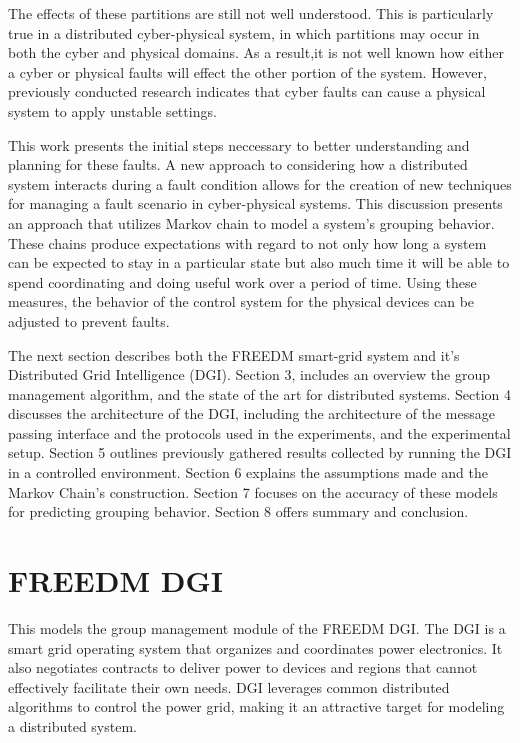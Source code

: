 The effects of these partitions are still not well understood.
This is particularly true in a distributed cyber-physical system, in which partitions may occur in both the cyber and physical domains.
As a result,it is not well known how either a cyber or physical faults will effect the other portion of the system.
However, previously conducted research \cite{HARINI}\cite{TSG} indicates that cyber faults can cause a
physical system to apply unstable settings.

This work presents the initial steps neccessary to better understanding and planning for these faults.
A new approach to considering how a distributed system interacts during a fault condition allows for the creation of new techniques for managing a fault scenario in cyber-physical systems. 
This discussion presents an approach that utilizes Markov chain to model a system's grouping behavior.
These chains produce expectations with regard to not only how long a system can be expected to stay in a particular state but also much time it will be able to spend coordinating and doing useful work over a period
of time. 
Using these measures, the behavior of the control system for the physical devices can be adjusted to prevent faults.

The next section describes both the FREEDM smart-grid system and it's Distributed Grid Intelligence (DGI).
Section 3, includes an overview the group management algorithm, and the state of the art for distributed systems.
Section 4 discusses the architecture of the DGI, including the architecture of the message passing interface and the protocols used in the experiments, and the experimental setup.
Section 5 outlines previously gathered results collected by running the DGI in a controlled environment.
Section 6 explains the assumptions made and the Markov Chain's construction. 
Section 7 focuses on the accuracy of these models for predicting grouping behavior.
Section 8 offers summary and conclusion.

\section{FREEDM DGI}
This models the group management module of the FREEDM DGI.
The DGI is a smart grid operating system that organizes and coordinates power electronics.
It also negotiates contracts to deliver power to devices and regions that cannot effectively facilitate their own needs.
DGI leverages common distributed algorithms to control the power grid, making it an attractive target for modeling a distributed system.

